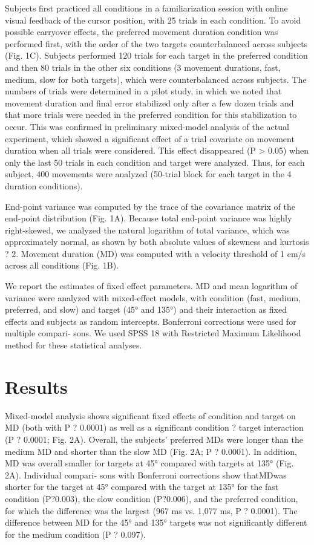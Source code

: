 Subjects first practiced all conditions in a familiarization session with online visual feedback of the cursor position, with 25 trials in each condition. 
To avoid possible carryover effects, the preferred movement duration condition was performed first, with the order of the two targets counterbalanced across subjects (Fig. 1C). 
Subjects performed 120 trials for each target in the preferred condition and then 80 trials in the other six conditions (3 movement durations, fast, medium, slow for both targets), which were counterbalanced across subjects. 
The numbers of trials were determined in a pilot study, in which we noted that movement duration and final error stabilized only after a few dozen trials and that more trials were needed in the preferred condition for this stabilization to occur. 
This was confirmed in preliminary mixed-model analysis of the actual experiment, which showed a significant effect of a trial covariate on movement duration when all trials were considered. This effect disappeared (P > 0.05) when only the last 50 trials in each condition and target were analyzed. Thus, for each subject, 400 movements were analyzed (50-trial block for each target in the 4 duration conditions).

End-point variance was computed by the trace of the covariance matrix of the end-point distribution (Fig. 1A). Because total end-point variance was highly right-skewed, we analyzed the natural logarithm of total variance, which was approximately normal, as shown by both absolute values of skewness and kurtosis ? 2. Movement duration (MD) was computed with a velocity threshold of 1 cm/s across all conditions (Fig. 1B).

We report the estimates of fixed effect parameters. MD and mean logarithm of variance were analyzed with mixed-effect models, with condition (fast, medium, preferred, and slow) and target (45° and 135°) and their interaction as fixed effects and subjects as random intercepts. Bonferroni corrections were used for multiple compari- sons. We used SPSS 18 with Restricted Maximum Likelihood method for these statistical analyses.

\section{Results}

Mixed-model analysis shows significant fixed effects of condition and target on MD (both with P ? 0.0001) as well as a significant condition ? target interaction (P ? 0.0001; Fig. 2A). Overall, the subjects’ preferred MDs were longer than the medium MD and shorter than the slow MD (Fig. 2A; P ? 0.0001). In addition, MD was overall smaller for targets at 45° compared with targets at 135° (Fig. 2A). Individual compari- sons with Bonferroni corrections show thatMDwas shorter for the target at 45° compared with the target at 135° for the fast condition (P?0.003), the slow condition (P?0.006), and the preferred condition, for which the difference was the largest (967 ms vs. 1,077 ms, P ? 0.0001). The difference between MD for the 45° and 135° targets was not significantly different for the medium condition (P ? 0.097). 

